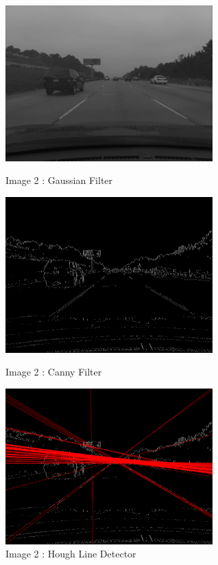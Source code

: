 \documentclass[12pt,a4paper]{report}
\begin{document}
\begin{figure}[!htb]
  \centering
  \includegraphics[height=6cm]{result_img/img2_q1.png}
  \caption{Image 2 : Gaussian Filter}
  \includegraphics[height=6cm]{result_img/img2_q2.png}
  \caption{Image 2 : Canny Filter}
  \includegraphics[height=6cm]{result_img/img2_q3.png}
  \caption{Image 2 : Hough Line Detector}
\end{figure}
\end{document}
